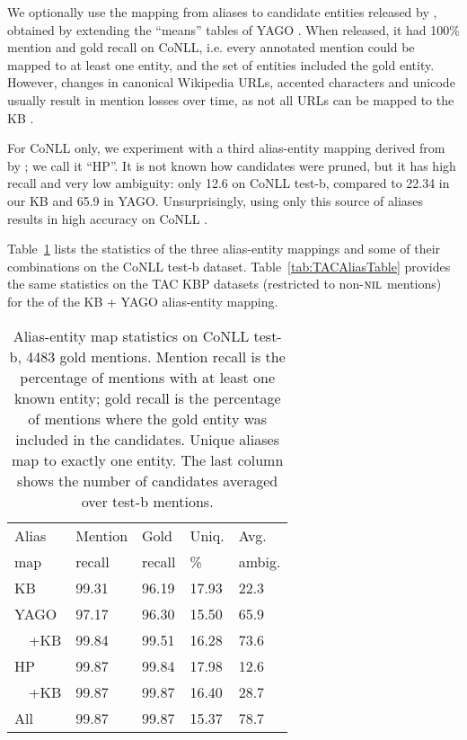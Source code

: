 We optionally use the mapping from aliases to candidate entities released
by , obtained by extending the
``means'' tables of YAGO \cite{hoffart2013yago2}.  When released,
it had 100\% mention and gold recall on CoNLL, i.e. every annotated mention
could be mapped to at least one entity, and the set of entities included the gold entity. 
However, changes in canonical Wikipedia URLs, accented characters and
unicode usually result in mention losses over time, as not all URLs can be mapped to the
KB \cite[Sec.~4]{hasibi2016reproducibility}.

For CoNLL only, we experiment with a third alias-entity mapping derived 
from  by ; we call it ``HP''.  
It is not known how candidates were pruned, but it has high recall
and very low ambiguity: only 12.6 on CoNLL test-b, compared to 22.34 in our KB
and 65.9 in YAGO.  Unsurprisingly, using only this source of aliases results in
high accuracy on CoNLL \cite{Pershina2015,YamadaS0T16}.

Table~\ref{tab:AliasTable} lists the statistics of the three alias-entity mappings
and some of their combinations on the CoNLL test-b dataset. 
Table~\ref{tab:TACAliasTable} provides the same statistics on the TAC KBP datasets 
(restricted to non-$\mbox{\textsc{nil}}$ mentions) for the of the KB + YAGO alias-entity mapping.



\begin{table}
  \centering
  \begin{tabular}{l|l|l|l|l}
    Alias  & Mention &   Gold  & Uniq.  & Avg.  \\
    map    & recall  & recall  & \%     & ambig. \\
    \hline
    KB & 99.31 & 96.19 & 17.93 & 22.3 \\
    \hline
    YAGO   & 97.17 & 96.30 & 15.50 & 65.9 \\
    ~~+KB  & 99.84 & 99.51 & 16.28 & 73.6 \\
    \hline
    HP     & 99.87 & 99.84 & 17.98 & 12.6 \\
    ~~+KB  & 99.87 & 99.87 & 16.40 & 28.7 \\
    \hline
    All    & 99.87 & 99.87 & 15.37 & 78.7
  \end{tabular}
  \caption{Alias-entity map statistics on CoNLL test-b,
    4483 gold mentions.  Mention recall is the percentage of
    mentions with at least one known entity; gold recall is the percentage
    of mentions where the gold entity was included in the candidates.
    Unique aliases map to exactly one entity.  The last column
    shows the number of candidates averaged over test-b mentions.}
  \label{tab:AliasTable}
\end{table}

